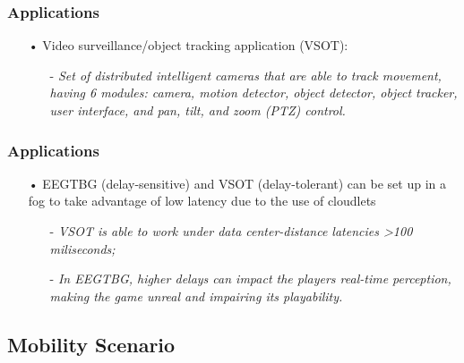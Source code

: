 \documentclass[10pt, pdf, xcolor=pdftex, dvipsnames, table]{beamer}
\begin{document}
\begin{frame}
	\frametitle{Applications}
 	\begin{block}{}
 		\begin{itemize}
 		    \item[•] Video surveillance/object tracking application (VSOT):\newline
 				\begin{itemize}
 		    		\item[-] \footnotesize\textit{Set of distributed intelligent cameras that are able to track movement, having 6 modules: camera, motion detector, object detector, object tracker, user interface, and pan, tilt, and zoom (PTZ) control.}\newline
 		    	\end{itemize}
 		\end{itemize}
 	\end{block}
\end{frame}

\begin{frame}
	\frametitle{Applications}
 	\begin{block}{}
 		\begin{itemize}
 		    \item[•] EEGTBG (delay-sensitive) and VSOT (delay-tolerant) can be set up in a fog to take advantage of low latency due to the use of cloudlets\newline
 				\begin{itemize}
 		    		\item[-] \footnotesize\textit{VSOT is able to work under data center-distance latencies >100 miliseconds;}\newline
 		    		\item[-] \footnotesize\textit{In EEGTBG, higher delays can impact the players real-time perception, making the game unreal and impairing its playability.}
 		    	\end{itemize}
 		\end{itemize}
 	\end{block}
\end{frame}

\subsection[Mobility Scenario]{Mobility Scenario}
\end{document}
